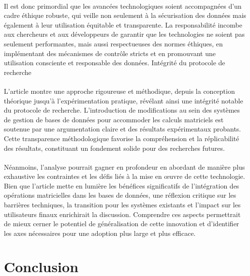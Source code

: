 \documentclass[a4paper, 12pt]{article}
\begin{document}
\paragraph{}
Il est donc primordial que les avancées technologiques soient accompagnées d'un cadre éthique robuste, qui veille non seulement à la sécurisation des données mais également à leur utilisation équitable et transparente. La responsabilité incombe aux chercheurs et aux développeurs de garantir que les technologies ne soient pas seulement performantes, mais aussi respectueuses des normes éthiques, en implémentant des mécanismes de contrôle stricts et en promouvant une utilisation consciente et responsable des données.
Intégrité du protocole de recherche

\paragraph{}
L'article montre une approche rigoureuse et méthodique, depuis la conception théorique jusqu'à l'expérimentation pratique, révélant ainsi une intégrité notable du protocole de recherche. L'introduction de modifications au sein des systèmes de gestion de bases de données pour accommoder les calculs matriciels est soutenue par une argumentation claire et des résultats expérimentaux probants. Cette transparence méthodologique favorise la compréhension et la réplicabilité des résultats, constituant un fondement solide pour des recherches futures.

\paragraph{}
Néanmoins, l'analyse pourrait gagner en profondeur en abordant de manière plus exhaustive les contraintes et les défis liés à la mise en œuvre de cette technologie. Bien que l'article mette en lumière les bénéfices significatifs de l'intégration des opérations matricielles dans les bases de données, une réflexion critique sur les barrières techniques, la transition pour les systèmes existants et l'impact sur les utilisateurs finaux enrichirait la discussion. Comprendre ces aspects permettrait de mieux cerner le potentiel de généralisation de cette innovation et d'identifier les axes nécessaires pour une adoption plus large et plus efficace.

\clearpage 
\section*{Conclusion}
\end{document}
